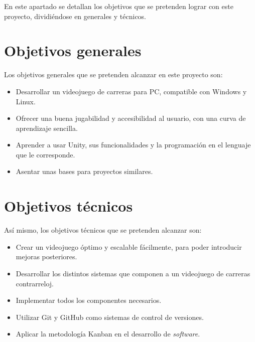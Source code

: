 En este apartado se detallan los objetivos que se pretenden lograr con este proyecto, dividiéndose en generales y técnicos.

\section{Objetivos generales}

Los objetivos generales que se pretenden alcanzar en este proyecto son:

\begin{itemize}
\tightlist
	\item Desarrollar un videojuego de carreras para PC, compatible con Windows y Linux.
	\item Ofrecer una buena jugabilidad y accesibilidad al usuario, con una curva de aprendizaje sencilla.
	\item Aprender a usar Unity, sus funcionalidades y la programación en el lenguaje que le corresponde.
	\item Asentar unas bases para proyectos similares.
\end{itemize}

\section{Objetivos técnicos}

Así mismo, los objetivos técnicos que se pretenden alcanzar son:

\begin{itemize}
\tightlist
	\item Crear un videojuego óptimo y escalable fácilmente, para poder introducir mejoras posteriores.
	\item Desarrollar los distintos sistemas que componen a un videojuego de carreras contrarreloj.
	\item Implementar todos los componentes necesarios.
	\item Utilizar Git y GitHub como sistemas de control de versiones.
	\item Aplicar la metodología Kanban en el desarrollo de \textit{software}.
\end{itemize}